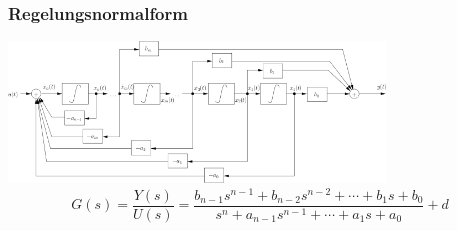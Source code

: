\subsubsection{Regelungsnormalform}
\includegraphics[width=10cm]{./bilder/zrd-regelungsnormalform.png} \\
\scriptsize
$$G(s)=\frac{Y(s)}{U(s)}=\frac{b_{n-1} s^{n-1} + b_{n-2} s^{n-2} +\cdots+b_{1} s 
+ b_{0}}{s^{n} + a_{n-1} s^{n-1} + \cdots + a_{1} s + a_{0}} + d$$\\
